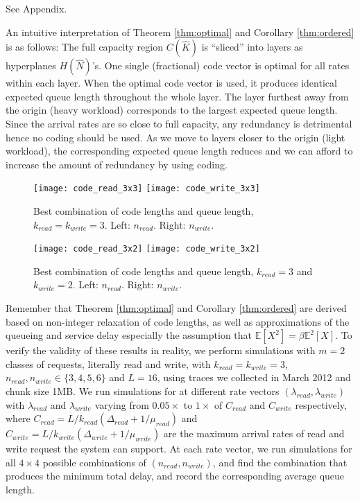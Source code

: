 \documentclass[journal]{IEEEtran}
\newcommand{\codeVec}{\hat{N}}
\newcommand{\minCodeVec}{\hat{K}}
\newcommand{\Expect}{\mathbb{E}}
\begin{document}
\begin{IEEEproof}
See Appendix.
\end{IEEEproof}

An intuitive interpretation of Theorem \ref{thm:optimal} and Corollary \ref{thm:ordered} is as follows: The full capacity region $C(\minCodeVec)$ is ``sliced'' into layers as hyperplanes $H(\codeVec)$'s. One single (fractional) code vector is optimal for all rates within each layer. When the optimal code vector is used, it produces identical expected queue length throughout the whole layer.  
The layer furthest away from the origin (heavy workload) corresponds to the largest expected queue length. Since the arrival rates are so close to full capacity, any redundancy is detrimental hence no coding should be used. As we move to layers closer to the origin (light workload), the corresponding expected queue length reduces and we can afford to increase the amount of redundancy by using coding.


\begin{figure}[t]
\centering
\texttt{[image: code\_read\_3x3]}
\texttt{[image: code\_write\_3x3]}
\vspace{-20pt}
\caption{Best combination of code lengths and queue length, $k_{read}=k_{write}=3$. Left: $n_{read}$. Right: $n_{write}$.}
\label{fig:code_3x3}
\vspace{-5pt}
\end{figure}

\begin{figure}[t]
\centering
\texttt{[image: code\_read\_3x2]}
\texttt{[image: code\_write\_3x2]}
\vspace{-20pt}
\caption{Best combination of code lengths and queue length, $k_{read}=3$ and $k_{write}=2$. Left: $n_{read}$. Right: $n_{write}$.}
\label{fig:code_3x2}
\vspace{-15pt}
\end{figure}


Remember that Theorem \ref{thm:optimal} and Corollary \ref{thm:ordered} are derived based on non-integer relaxation of code lengths, as well as approximations of the queueing and service delay especially the assumption that $\Expect[X^2] =\beta \Expect^2[X]$. To verify the validity of these results in reality, we perform simulations with $m=2$ classes of requests, literally read and write, with $k_{read}=k_{write}=3$, $n_{read},n_{write}\in\{3,4,5,6\}$ and $L=16$, using traces we collected in March 2012 and chunk size 1MB. We run simulations for at different rate vectors $(\lambda_{read},\lambda_{write})$ with $\lambda_{read}$ and $\lambda_{write}$ varying from $0.05\times$ to $1\times$ of $C_{read}$ and $C_{write}$ respectively, where
$C_{read} = L/k_{read}(\Delta_{read}+1/\mu_{read})$ and 
$C_{write} = L/k_{write}(\Delta_{write}+1/\mu_{write})$ are the maximum arrival rates of read and write request the system can support. At each rate vector, we  run simulations for all $4\times 4$ possible combinations of $(n_{read},n_{write})$, and find the combination that produces the minimum total delay, and record the corresponding average queue length.
\end{document}
